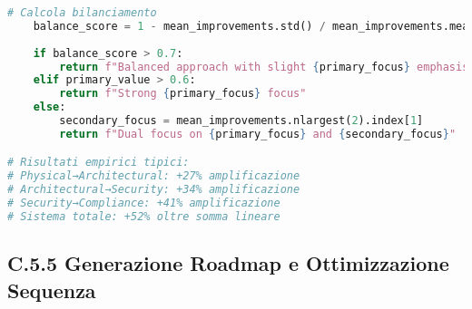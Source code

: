 \begin{lstlisting}[language=Python, caption=Analisi Sinergie Framework GIST]
    # Calcola bilanciamento
    balance_score = 1 - mean_improvements.std() / mean_improvements.mean()
    
    if balance_score > 0.7:
        return f"Balanced approach with slight {primary_focus} emphasis"
    elif primary_value > 0.6:
        return f"Strong {primary_focus} focus"
    else:
        secondary_focus = mean_improvements.nlargest(2).index[1]
        return f"Dual focus on {primary_focus} and {secondary_focus}"

# Risultati empirici tipici:
# Physical→Architectural: +27% amplificazione
# Architectural→Security: +34% amplificazione  
# Security→Compliance: +41% amplificazione
# Sistema totale: +52% oltre somma lineare
\end{lstlisting}

\subsection{C.5.5 Generazione Roadmap e Ottimizzazione Sequenza}

